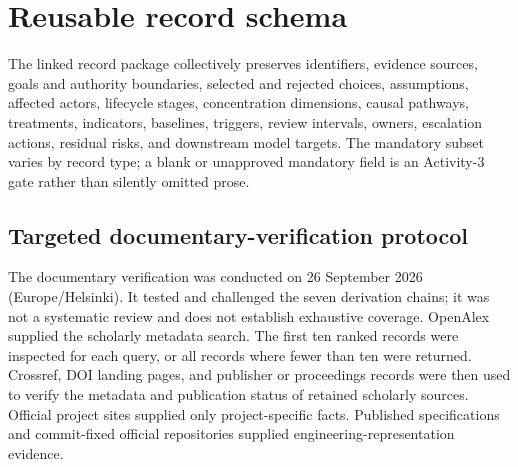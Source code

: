 \documentclass[10pt]{article}
\begin{document}
\section*{Reusable record schema}
The linked record package collectively preserves identifiers, evidence sources,
goals and authority boundaries, selected and rejected choices, assumptions,
affected actors, lifecycle stages, concentration dimensions, causal pathways,
treatments, indicators, baselines, triggers, review intervals, owners,
escalation actions, residual risks, and downstream model targets. The mandatory
subset varies by record type; a blank or unapproved mandatory field is an
Activity-3 gate rather than silently omitted prose.

\clearpage
\begin{landscape}
\section*{Targeted documentary-verification protocol}

The documentary verification was conducted on 26 September 2026 (Europe/Helsinki).
It tested and challenged the seven derivation chains; it was not a systematic
review and does not establish exhaustive coverage. OpenAlex supplied the
scholarly metadata search. The first ten ranked records were inspected for each
query, or all records where fewer than ten were returned. Crossref, DOI landing
pages, and publisher or proceedings records were then used to verify the
metadata and publication status of retained scholarly sources. Official project
sites supplied only project-specific facts. Published specifications and
commit-fixed official repositories supplied engineering-representation evidence.


\end{landscape}
\end{document}
